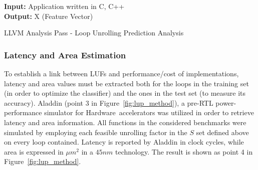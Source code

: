 \documentclass[]{usiinfthesis}
\newcommand{\HW}{{Hardware}}
\begin{document}
\begin{algorithm}[t]
\begin{flushleft}
\textbf{Input:}  Application written in C, C++\\
\textbf{Output:} X (Feature Vector)\\
\end{flushleft}
\begin{algorithmic}[1]
 { }
     {}
    \EndIf
  \EndFor
\EndFunction
\State
{}
   {}
   {}
\EndFunction
\end{algorithmic}
\caption{LLVM Analysis Pass - Loop Unrolling Prediction Analysis} 
\label{Algo_LLVM}

\end{algorithm}

\subsubsection{Latency and Area Estimation}
\label{sec:ml_la}

To establish a link between LUFs and performance/cost of
implementations, latency and area values must be extracted both for
the loops in the training set (in order to optimize the classifier)
and the ones in the test set (to measure its accuracy).%
Aladdin \cite{ShaoJul14} (point 3 in
Figure~\ref{fig:lup_method}), a pre-RTL power-performance simulator
for \HW\ accelerators was utilized in order to retrieve latency and area 
information. All functions in the considered benchmarks were
simulated by employing each feasible unrolling factor in the $S$ set 
defined above on every loop contained.  
Latency is reported by Aladdin in clock cycles,
while area is expressed in $\mu m^2$ in a $45nm$ technology. The
result is shown as point 4 in Figure~\ref{fig:lup_method}.
\par
\end{document}
